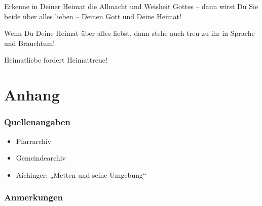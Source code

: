 \documentclass[12pt,a4paper]{book}
\begin{document}
Erkenne in Deiner Heimat die Allmacht und Weisheit Gottes – dann wirst
Du Sie beide über alles lieben – Deinen Gott und Deine Heimat!

Wenn Du Deine Heimat über alles liebst, dann stehe auch treu zu ihr in
Sprache und Brauchtum!

Heimatliebe fordert Heimattreue!

\part{Anhang}

\section{Quellenangaben}

\begin{itemize}
\item Pfarrarchiv
\item Gemeindearchiv
\item Aichinger: „Metten und seine Umgebung“
\end{itemize}

\section{Anmerkungen}
\end{document}
